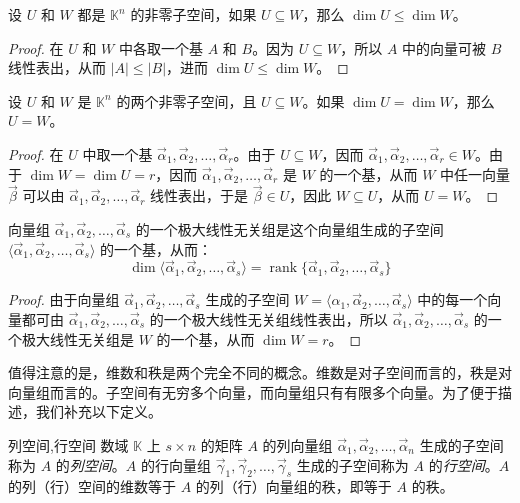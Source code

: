 \begin{theorem}
	设 $U$ 和 $W$ 都是 $\mathbb K^n$ 的非零子空间，如果 $U \subseteq W$，那么 $\dim U \le \dim W$。
\end{theorem}

\begin{proof}
	在 $U$ 和 $W$ 中各取一个基 $A$ 和 $B$。因为 $U \subseteq W$，所以 $A$ 中的向量可被 $B$ 线性表出，从而 $|A| \le |B|$，进而 $\dim U \le \dim W$。
\end{proof}

\begin{theorem}
	设 $U$ 和 $W$ 是 $\mathbb K^n$ 的两个非零子空间，且 $U \subseteq W$。如果 $\dim U = \dim W$，那么 $U = W$。
\end{theorem}

\begin{proof}
	在 $U$ 中取一个基 $\vec \alpha_1, \vec \alpha_2, \ldots, \vec \alpha_r$。由于 $U \subseteq W$，因而 $\vec \alpha_1, \vec \alpha_2, \ldots, \vec \alpha_r \in W$。由于 $\dim W = \dim U = r$，因而 $\vec \alpha_1, \vec \alpha_2, \ldots, \vec \alpha_r$ 是 $W$ 的一个基，从而 $W$ 中任一向量 $\vec \beta$ 可以由 $\vec \alpha_1, \vec \alpha_2, \ldots, \vec \alpha_r$ 线性表出，于是 $\vec \beta \in U$，因此 $W \subseteq U$，从而 $U = W$。
\end{proof}

\begin{theorem}
	向量组 $\vec \alpha_1, \vec \alpha_2, \ldots, \vec \alpha_s$ 的一个极大线性无关组是这个向量组生成的子空间 $\langle \vec \alpha_1, \vec \alpha_2, \ldots, \vec \alpha_s \rangle$ 的一个基，从而：
	$$
	\dim \langle \vec \alpha_1, \vec \alpha_2, \ldots, \vec \alpha_s \rangle = \operatorname{rank} \{\vec \alpha_1, \vec \alpha_2, \ldots, \vec \alpha_s\}
	$$
\end{theorem}

\begin{proof}
	由于向量组 $\vec \alpha_1, \vec \alpha_2, \ldots, \vec \alpha_s$ 生成的子空间 $W = \langle \alpha_1, \vec \alpha_2, \ldots, \vec \alpha_s \rangle$ 中的每一个向量都可由 $\vec \alpha_1, \vec \alpha_2, \ldots, \vec \alpha_s$ 的一个极大线性无关组线性表出，所以 $\vec \alpha_1, \vec \alpha_2, \ldots, \vec \alpha_s$ 的一个极大线性无关组是 $W$ 的一个基，从而 $\dim W = r$。
\end{proof}

值得注意的是，维数和秩是两个完全不同的概念。维数是对子空间而言的，秩是对向量组而言的。子空间有无穷多个向量，而向量组只有有限多个向量。为了便于描述，我们补充以下定义。

\begin{definition}{列空间,行空间}
	数域 $\mathbb K$ 上 $s \times n$ 的矩阵 $A$ 的列向量组 $\vec \alpha_1, \vec \alpha_2, \ldots, \vec \alpha_n$ 生成的子空间称为 $A$ 的\emph{列空间}。$A$ 的行向量组 $\vec \gamma_1, \vec \gamma_2, \ldots, \vec \gamma_s$ 生成的子空间称为 $A$ 的\emph{行空间}。$A$ 的列（行）空间的维数等于 $A$ 的列（行）向量组的秩，即等于 $A$ 的秩。
\end{definition}